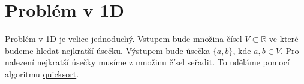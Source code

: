 \chapter{Problém v 1D}
\label{chap:problem_1D}
Problém v 1D je velice jednoduchý. Vstupem bude množina čísel $V \subset \mathbb{R}$ ve které budeme hledat nejkratší úsečku. Výstupem bude úsečka $\{a, b\}$, kde $ a, b \in V$. Pro nalezení nejkratší úsečky musíme z množinu čísel seřadit. To uděláme pomocí algoritmu \hyperref[sec:quicksort]{quicksort}.


